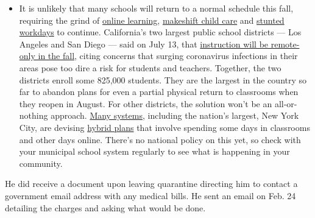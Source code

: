 \begin{itemize}
  \begin{itemize}
  \tightlist
  \item
    It is unlikely that many schools will return to a normal schedule
    this fall, requiring the grind of
    \href{https://www.nytimes.com/2020/06/05/us/coronavirus-education-lost-learning.html?action=click\&pgtype=Article\&state=default\&region=MAIN_CONTENT_3\&context=storylines_faq}{online
    learning},
    \href{https://www.nytimes.com/2020/05/29/us/coronavirus-child-care-centers.html?action=click\&pgtype=Article\&state=default\&region=MAIN_CONTENT_3\&context=storylines_faq}{makeshift
    child care} and
    \href{https://www.nytimes.com/2020/06/03/business/economy/coronavirus-working-women.html?action=click\&pgtype=Article\&state=default\&region=MAIN_CONTENT_3\&context=storylines_faq}{stunted
    workdays} to continue. California's two largest public school
    districts --- Los Angeles and San Diego --- said on July 13, that
    \href{https://www.nytimes.com/2020/07/13/us/lausd-san-diego-school-reopening.html?action=click\&pgtype=Article\&state=default\&region=MAIN_CONTENT_3\&context=storylines_faq}{instruction
    will be remote-only in the fall}, citing concerns that surging
    coronavirus infections in their areas pose too dire a risk for
    students and teachers. Together, the two districts enroll some
    825,000 students. They are the largest in the country so far to
    abandon plans for even a partial physical return to classrooms when
    they reopen in August. For other districts, the solution won't be an
    all-or-nothing approach.
    \href{https://bioethics.jhu.edu/research-and-outreach/projects/eschool-initiative/school-policy-tracker/}{Many
    systems}, including the nation's largest, New York City, are
    devising
    \href{https://www.nytimes.com/2020/06/26/us/coronavirus-schools-reopen-fall.html?action=click\&pgtype=Article\&state=default\&region=MAIN_CONTENT_3\&context=storylines_faq}{hybrid
    plans} that involve spending some days in classrooms and other days
    online. There's no national policy on this yet, so check with your
    municipal school system regularly to see what is happening in your
    community.
  \end{itemize}
\end{itemize}

He did receive a document upon leaving quarantine directing him to
contact a government email address with any medical bills. He sent an
email on Feb. 24 detailing the charges and asking what would be done.

